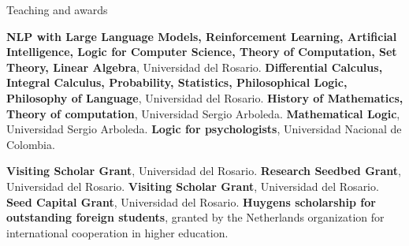 \begin{rubric}{Teaching and awards}

\entry*[2017 -- ] \textbf{NLP with Large Language Models, Reinforcement Learning, Artificial Intelligence, Logic for Computer Science, Theory of Computation, Set Theory, Linear Algebra}, Universidad del Rosario.
%
\entry*[2007 -- 2016] \textbf{Differential Calculus, Integral Calculus, Probability, Statistics, Philosophical Logic, Philosophy of Language}, Universidad del Rosario.
%
\entry*[2006] \textbf{History of Mathematics, Theory of computation}, Universidad Sergio Arboleda.
%
\entry*[2003] \textbf{Mathematical Logic}, Universidad Sergio Arboleda.
%
\entry*[2002] \textbf{Logic for psychologists}, Universidad Nacional de Colombia.

\entry*[2022] \textbf{Visiting Scholar Grant}, Universidad del Rosario.
%
\entry*[2020] \textbf{Research Seedbed Grant}, Universidad del Rosario.
%
\entry*[2018] \textbf{Visiting Scholar Grant}, Universidad del Rosario.
%
\entry*[2018] \textbf{Seed Capital Grant}, Universidad del Rosario.
%
\entry*[2004] \textbf{Huygens scholarship for outstanding foreign   students}, granted by the Netherlands organization for international cooperation in higher education.

\end{rubric}